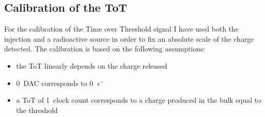     \subsection{Calibration of the ToT}\label{sec:cal_ToT}
        For the calibration of the Time over Threshold signal I have used both the injection and a radioactive source in order to fix an absolute scale of the charge detected. 
        The calibration is based on the following assumptions:
        \begin{itemize}
            \item the ToT linearly depends on the charge released
            \item \SI{0}{DAC} corresponds to \SI{0}{\elementarycharge}$^-$
            \item a ToT of \SI{1}{clock} count corresponds to a charge produced in the bulk equal to the threshold  
        \end{itemize}
        
